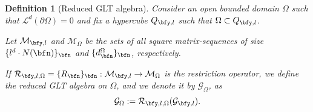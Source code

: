 \documentclass{amsart}
\newtheorem{defn}[thm]{Definition}
\begin{document}
\begin{defn}[Reduced GLT algebra]\label{reduced_GLT}
    Consider an open bounded domain $\Omega$ such that $\mathcal{L}^d(\partial\Omega)=0$ and fix a hypercube $Q_{\bfy,l}$ such that $\Omega\subset Q_{\bfy,l}$. 
    
    Let $\mathcal{M}_{\bfy,l}$ and $\mathcal{M}_{\Omega}$ be the sets of all square matrix-sequences of size $\{l^d\cdot N(\bfn)\}_{\bfn}$ and $\{d_{\bfn}^{\Omega}\}_{\bfn}$, respectively. 
    
    If $\mathcal{R}_{\bfy,l,\Omega}=\{R_\bfn\}_\bfn:\mathcal{M}_{\bfy,l}\to\mathcal{M}_{\Omega}$ is the restriction operator, we define the reduced GLT algebra on $\Omega$, and we denote it by $\mathcal{G}_{\Omega}$, as
    \begin{equation*}
        \mathcal{G}_{\Omega}:=\mathcal{R}_{\bfy,l,\Omega}(\mathcal{G}_{\bfy,l}).
    \end{equation*}
\end{defn}
\end{document}
